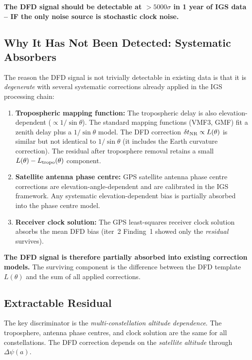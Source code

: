 \documentclass[aps,prd,twocolumn,superscriptaddress,nofootinbib]{revtex4-2}
\newcommand{\deltaT}{\delta t_{\rm NR}}
\begin{document}
\textbf{The DFD signal should be detectable at $>5000\sigma$ in
1 year of IGS data -- IF the only noise source is stochastic
clock noise.}

\subsection{Why It Has Not Been Detected: Systematic Absorbers}

The reason the DFD signal is not trivially detectable in existing
data is that it is \emph{degenerate} with several systematic
corrections already applied in the IGS processing chain:

\begin{enumerate}
\item \textbf{Tropospheric mapping function:} The tropospheric delay
is also elevation-dependent ($\propto 1/\sin\theta$). The standard
mapping functions (VMF3, GMF) fit a zenith delay plus a
$1/\sin\theta$ model. The DFD correction
$\deltaT \propto L(\theta)$ is similar but not identical to
$1/\sin\theta$ (it includes the Earth curvature correction).
The residual after troposphere removal retains a small
$L(\theta) - L_{\rm tropo}(\theta)$ component.

\item \textbf{Satellite antenna phase centre:} GPS satellite antenna
phase centre corrections are elevation-angle-dependent and are
calibrated in the IGS framework. Any systematic elevation-dependent
bias is partially absorbed into the phase centre model.

\item \textbf{Receiver clock solution:} The GPS least-squares
receiver clock solution absorbs the mean DFD bias (iter~2 Finding~1
showed only the \emph{residual} survives).
\end{enumerate}

\textbf{The DFD signal is therefore partially absorbed into existing
correction models.} The surviving component is the difference between
the DFD template $L(\theta)$ and the sum of all applied corrections.

\subsection{Extractable Residual}

The key discriminator is the \emph{multi-constellation altitude
dependence}. The troposphere, antenna phase centres, and clock
solution are the same for all constellations. The DFD correction
depends on the \emph{satellite altitude} through $\Delta\psi(a)$.
\end{document}
